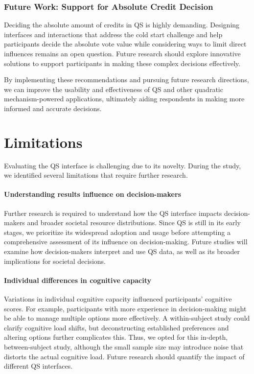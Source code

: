 \subsubsection{Future Work: Support for Absolute Credit Decision}
Deciding the absolute amount of credits in QS is highly demanding. Designing interfaces and interactions that address the cold start challenge and help participants decide the absolute vote value while considering ways to limit direct influences remains an open question. Future research should explore innovative solutions to support participants in making these complex decisions effectively.

By implementing these recommendations and pursuing future research directions, we can improve the usability and effectiveness of QS and other quadratic mechanism-powered applications, ultimately aiding respondents in making more informed and accurate decisions.

\section{Limitations}
\label{sec:limitations}
Evaluating the QS interface is challenging due to its novelty. During the study, we identified several limitations that require further research.

\paragraph{Understanding results influence on decision-makers}
Further research is required to understand how the QS interface impacts decision-makers and broader societal resource distributions. Since QS is still in its early stages, we prioritize its widespread adoption and usage before attempting a comprehensive assessment of its influence on decision-making. Future studies will examine how decision-makers interpret and use QS data, as well as its broader implications for societal decisions.

\paragraph{Individual differences in cognitive capacity}
Variations in individual cognitive capacity influenced participants' cognitive scores. For example, participants with more experience in decision-making might be able to manage multiple options more effectively. A within-subject study could clarify cognitive load shifts, but deconstructing established preferences and altering options further complicates this. Thus, we opted for this in-depth, between-subject study, although the small sample size may introduce noise that distorts the actual cognitive load. Future research should quantify the impact of different QS interfaces.

